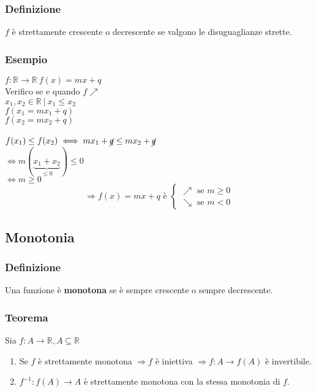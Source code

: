 \subsubsection*{Definizione}
$f$ è strettamente crescente o decrescente se valgono le disuguaglianze strette.
\subsubsection*{Esempio}
$f:\mathbb{R} \rightarrow \mathbb{R}\ f(x) = mx + q$ \\
Verifico se e quando $f \nearrow$ \\
$x_{1},x_{2} \in \mathbb{R}\ |\ x_{1} \leq x_{2}$ \\
$f(x_{1} = mx_{1} + q)$ \\
$f(x_{2} = mx_{2} + q)$ \\ \\
$f(x_1) \leq f(x_2) \iff mx_{1} + \cancel{q} \leq mx_{2} + \cancel{q}$\\
    $\iff m(\underbrace{x_1+x_{2}}_{\leq 0}) \leq 0$ \\
    $\iff m \geq 0$ \\
    \[\Rightarrow f(x) = mx+q \text{ è } \begin{cases}
        \nearrow \text{ se } m \geq 0\\
        \searrow \text{ se } m < 0
        \end{cases}
    \]

\subsection*{Monotonia}
\subsubsection*{Definizione}
Una funzione è \textbf{monotona} se è sempre crescente o sempre decrescente.
\subsubsection*{Teorema}
Sia $f:A \rightarrow \mathbb{R}, A \subseteq \mathbb{R}$
\begin{enumerate}
    \item Se $f$ è strettamente monotona $\Rightarrow f$ è iniettiva $\Rightarrow f:A \rightarrow f(A)$ è invertibile.
    \item $f^{-1}:f(A) \rightarrow A$ è strettamente monotona con la stessa monotonia di $f$.
\end{enumerate}

